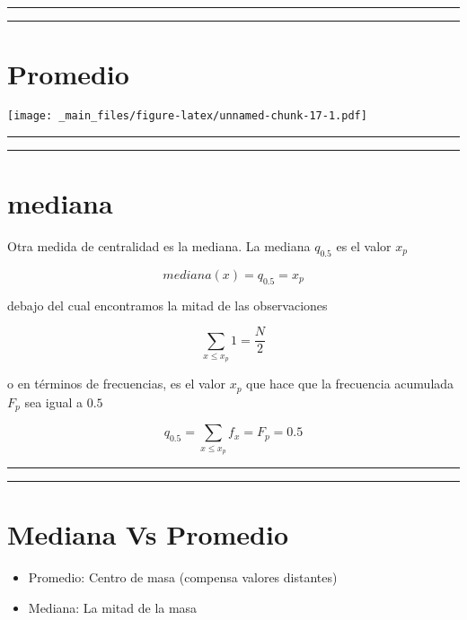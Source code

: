 \documentclass[
]{book}
\providecommand{\tightlist}{%
  \setlength{\itemsep}{0pt}\setlength{\parskip}{0pt}}
\begin{document}
\begin{center}\rule{0.5\linewidth}{0.5pt}\end{center}

\begin{center}\rule{0.5\linewidth}{0.5pt}\end{center}

\hypertarget{promedio-2}{%
\section{Promedio}\label{promedio-2}}

\texttt{[image: \_main\_files/figure-latex/unnamed-chunk-17-1.pdf]}

\begin{center}\rule{0.5\linewidth}{0.5pt}\end{center}

\begin{center}\rule{0.5\linewidth}{0.5pt}\end{center}

\hypertarget{mediana}{%
\section{mediana}\label{mediana}}

Otra medida de centralidad es la mediana. La mediana \(q_{0.5}\) es el valor \(x_p\)

\[mediana(x)=q_{0.5}=x_p\]

debajo del cual encontramos la mitad de las observaciones

\[\sum_{x\leq x_p} 1 = \frac{N}{2}\]

o en términos de frecuencias, es el valor \(x_p\) que hace que la frecuencia acumulada \(F_p\) sea igual a \(0.5\)

\[q_{0.5}=\sum_{x\leq x_p} f_x =F_p=0.5\]

\begin{center}\rule{0.5\linewidth}{0.5pt}\end{center}

\begin{center}\rule{0.5\linewidth}{0.5pt}\end{center}

\hypertarget{mediana-vs-promedio}{%
\section{Mediana Vs Promedio}\label{mediana-vs-promedio}}

\begin{itemize}
\tightlist
\item
  Promedio: Centro de masa (compensa valores distantes)
\item
  Mediana: La mitad de la masa
\end{itemize}
\end{document}
